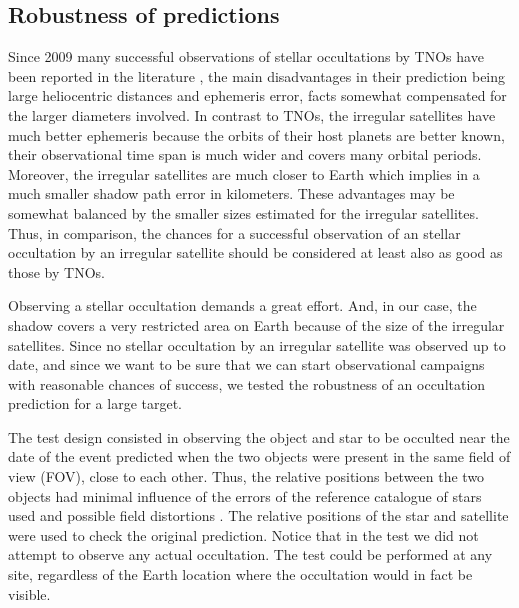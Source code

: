 \documentclass[useAMS,usenatbib]{mn2e}
\begin{document}
\subsection{Robustness of predictions} \label{Sec: testes}

Since 2009 many successful observations of stellar occultations by TNOs have been reported in the literature \citep{Elliot2010, Sicardy2011, Ortiz2012, Braga-Ribas2013}, the main disadvantages in their prediction being large heliocentric distances and ephemeris error, facts somewhat compensated for the larger diameters involved. In contrast to TNOs, the irregular satellites have much better ephemeris because the orbits of their host planets are better  known, their observational time span is much wider and covers many orbital periods. Moreover, the irregular satellites are much closer to Earth which implies in a much smaller shadow path error in kilometers. These advantages may be somewhat balanced by the smaller sizes estimated for the irregular satellites. Thus, in comparison, the chances for a successful observation of an stellar occultation by an irregular satellite should be considered at least also as good as those by TNOs.

Observing a stellar occultation demands a great effort. And, in our case, the shadow covers a very restricted area on Earth because of the size of the irregular satellites. Since no stellar occultation by an irregular satellite was observed up to date, and since we want to be sure that we can start observational campaigns with reasonable chances of success, we tested the robustness of an occultation prediction for a large target.

The test design consisted in observing the object and star to be occulted near the date of the event predicted when the two objects were present in the same field of view (FOV), close to each other. Thus, the relative positions between the two objects had minimal influence of the errors of the reference catalogue of stars used and possible field distortions \citep[and references therein]{Peng2008}. The relative positions of the star and satellite were used to check the original prediction. Notice that in the test we did not attempt to observe any actual occultation. The test could be performed at any site, regardless of the Earth location where the occultation would in fact be visible. 
\end{document}
